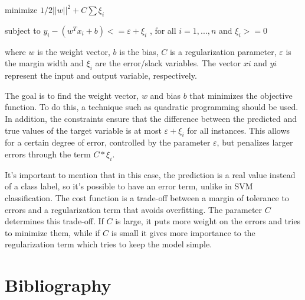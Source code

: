 \documentclass[11pt]{article}
\theoremstyle{definition}
\begin{document}
minimize $1/2||w||^2 + C ∑ ξ_i$

subject to $y_i - (w^T x_i + b) <= ε + ξ_i$ , for all $i = 1, ..., n$ and $ξ_i >= 0$

where $w$ is the weight vector, $b$ is the bias, $C$ is a regularization parameter, $ε$ is the margin width and $ξ_i$ are the error/slack variables. The vector $xi$ and $yi$ represent the input and output variable, respectively.

The goal is to find the weight vector, $w$ and bias $b$ that minimizes the objective function. To do this, a technique such as quadratic programming should be used. In addition, the constraints ensure that the difference between the predicted and true values of the target variable is at most $ε + ξ_i$ for all instances. This allows for a certain degree of error, controlled by the parameter $ε$, but penalizes larger errors through the term $C * ξ_i$.

It's important to mention that in this case, the prediction is a real value instead of a class label, so it's possible to have an error term, unlike in SVM classification. The cost function is a trade-off between a margin of tolerance to errors and a regularization term that avoids overfitting. The parameter $C$ determines this trade-off. If $C$ is large, it puts more weight on the errors and tries to minimize them, while if $C$ is small it gives more importance to the regularization term which tries to keep the model simple.

\citet{trafalisSVM}

\newpage

\citet{trafalisSVM}

\newpage


\section{Bibliography}
\printbibliography
\end{document}
